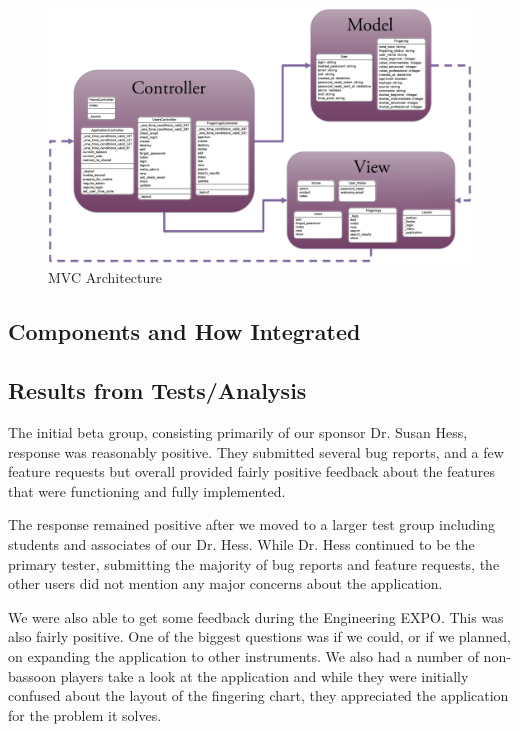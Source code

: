 \documentclass[12pt,english]{article}
\begin{document}
\begin{figure}[H]
\caption{MVC Architecture}


\includegraphics[scale=0.15]{MVC} 
\end{figure}



\subsection{Components and How Integrated}


\subsection{Results from Tests/Analysis}

The initial beta group, consisting primarily of our sponsor Dr. Susan
Hess, response was reasonably positive. They submitted several bug
reports, and a few feature requests but overall provided fairly positive
feedback about the features that were functioning and fully implemented.

The response remained positive after we moved to a larger test group
including students and associates of our Dr. Hess. While Dr. Hess
continued to be the primary tester, submitting the majority of bug
reports and feature requests, the other users did not mention any
major concerns about the application.

We were also able to get some feedback during the Engineering EXPO.
This was also fairly positive. One of the biggest questions was if
we could, or if we planned, on expanding the application to other
instruments. We also had a number of non-bassoon players take a look
at the application and while they were initially confused about the
layout of the fingering chart, they appreciated the application for
the problem it solves.
\end{document}
